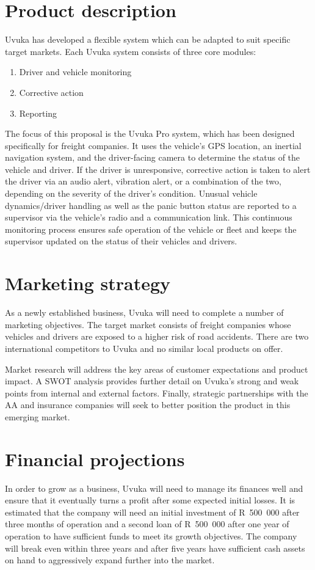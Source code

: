 \section*{Product description}
Uvuka has developed a flexible system which can be adapted to suit specific target markets. Each Uvuka system consists of three core modules:
\begin{enumerate}
\item Driver and vehicle monitoring
\item Corrective action
\item Reporting
\end{enumerate}
 
The focus of this proposal is the Uvuka Pro system, which has been designed specifically for freight companies. It uses the vehicle's GPS location, an inertial navigation system, and the driver-facing camera to determine the status of the vehicle and driver. If the driver is unresponsive, corrective action is taken to alert the driver via an audio alert, vibration alert, or a combination of the two, depending on the severity of the driver's condition. Unusual vehicle dynamics/driver handling as well as the panic button status are reported to a supervisor via the vehicle's radio and a communication link. This continuous monitoring process ensures safe operation of the vehicle or fleet and keeps the supervisor updated on the status of their vehicles and drivers.

\section*{Marketing strategy}
As a newly established business, Uvuka will need to complete a number of marketing objectives. The target market consists of freight companies whose vehicles and drivers are exposed to a higher risk of road accidents. There are two international competitors to Uvuka and no similar local products on offer.

Market research will address the key areas of customer expectations and product impact. A SWOT analysis provides further detail on Uvuka's strong and weak points from internal and external factors. Finally, strategic partnerships with the AA and insurance companies will seek to better position the product in this emerging market.

\section*{Financial projections}
In order to grow as a business, Uvuka will need to manage its finances well and ensure that it eventually turns a profit after some expected initial losses. It is estimated that the company will need an initial investment of R~500~000 after three months of operation and a second loan of R~500~000 after one year of operation to have sufficient funds to meet its growth objectives. The company will break even within three years and after five years have sufficient cash assets on hand to aggressively expand further into the market.

